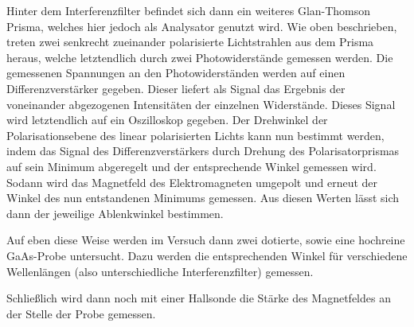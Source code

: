 Hinter dem Interferenzfilter befindet sich dann ein weiteres Glan-Thomson Prisma,
welches hier jedoch als Analysator genutzt wird. Wie oben beschrieben, treten zwei
senkrecht zueinander polarisierte Lichtstrahlen aus dem Prisma heraus, welche letztendlich
durch zwei Photowiderstände gemessen werden. Die gemessenen Spannungen an den Photowiderständen
werden auf einen Differenzverstärker gegeben. Dieser liefert als Signal das Ergebnis der voneinander
abgezogenen Intensitäten der einzelnen Widerstände. Dieses Signal wird letztendlich auf
ein Oszilloskop gegeben. Der Drehwinkel der Polarisationsebene des linear polarisierten Lichts
kann nun bestimmt werden, indem das Signal des Differenzverstärkers durch Drehung des
Polarisatorprismas auf sein Minimum abgeregelt und der entsprechende Winkel gemessen
wird. Sodann wird das Magnetfeld des Elektromagneten umgepolt und erneut der
Winkel des nun entstandenen Minimums gemessen. Aus diesen Werten lässt sich dann der
jeweilige Ablenkwinkel bestimmen.

Auf eben diese Weise werden im Versuch dann zwei dotierte, sowie eine hochreine
GaAs-Probe untersucht. Dazu werden die entsprechenden Winkel für verschiedene
Wellenlängen (also unterschiedliche Interferenzfilter) gemessen.

Schließlich wird dann noch mit einer Hallsonde die Stärke des Magnetfeldes an der
Stelle der Probe gemessen.
